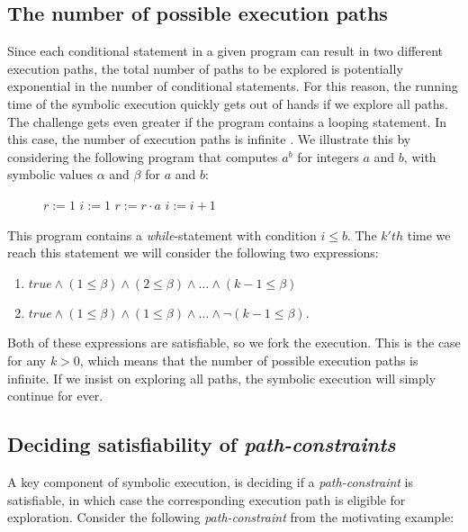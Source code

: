	\subsection{The number of possible execution paths} 
		Since each conditional statement in a given program can result in two different execution paths, the total number of paths to be explored is potentially exponential in the number of conditional statements. 
		For this reason, the running time of the symbolic execution quickly gets out of hands if we explore all paths. 
		 The challenge gets even greater if the program contains a looping statement. In this case, the number of execution paths is infinite \cite{CadarSen13}.
		  We illustrate this by considering the following program that computes $a^b$ for integers $a$ and $b$, with symbolic values $\alpha$ and $\beta$ for $a$ and $b$:
		\begin{figure}[!h]
			\begin{algorithmic}
				\State $r := 1$
				\State $i := 1$
					\State $ r := r\cdot a$
					\State $ i := i + 1$
				\EndWhile
				\State {}
				\EndProcedure
			\end{algorithmic}
		\end{figure}
		\pow{}
		
	This program contains a \textsl{while}-statement with condition $i \leq b$. The $k'th$ time we reach this statement we will consider the following two expressions:
	\begin{enumerate}
		\item $true \land (1 \leq \beta) \land (2 \leq \beta) \land \ldots \land (k-1 \leq \beta) $
		\item $true \land (1 \leq \beta) \land (1 \leq \beta) \land \ldots \land \neg (k-1 \leq \beta) $.
	\end{enumerate}
	Both of these expressions are satisfiable, so we fork the execution. This is the case for any $k > 0$, which means that the number of possible execution paths is infinite. If we insist on exploring all paths, the symbolic execution will simply continue for ever. 
	
	\subsection{Deciding satisfiability of \emph{path-constraints}}
	A key component of symbolic execution, is deciding if a \emph{path-constraint} is satisfiable, in which case the corresponding execution path is eligible for exploration. Consider the following \emph{path-constraint} from the motivating example:
	
